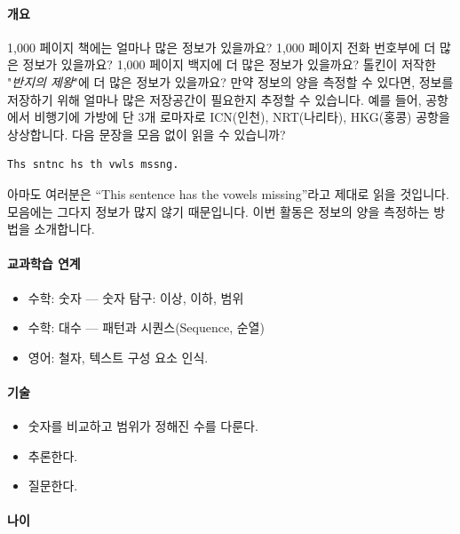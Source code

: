 \documentclass[]{article}
\begin{document}
\mbox{}\paragraph{개요}\label{section-73}

1,000 페이지 책에는 얼마나 많은 정보가 있을까요? 1,000 페이지 전화
번호부에 더 많은 정보가 있을까요? 1,000 페이지 백지에 더 많은 정보가
있을까요? 톨킨이 저작한 "\emph{반지의 제왕}"에 더 많은 정보가 있을까요?
만약 정보의 양을 측정할 수 있다면, 정보를 저장하기 위해 얼마나 많은
저장공간이 필요한지 추정할 수 있습니다. 예를 들어, 공항에서 비행기에
가방에 단 3개 로마자로 ICN(인천), NRT(나리타), HKG(홍콩) 공항을
상상합니다. 다음 문장을 모음 없이 읽을 수 있습니까?

\begin{verbatim}
Ths sntnc hs th vwls mssng.
\end{verbatim}

아마도 여러분은 ``This sentence has the vowels missing''라고 제대로 읽을
것입니다. 모음에는 그다지 정보가 많지 않기 때문입니다. 이번 활동은
정보의 양을 측정하는 방법을 소개합니다.

\mbox{}\paragraph{교과학습 연계}\label{section-74}

\begin{itemize}
\itemsep1pt\parskip0pt
\item
  수학: 숫자 --- 숫자 탐구: 이상, 이하, 범위
\item
  수학: 대수 --- 패턴과 시퀀스(Sequence, 순열)
\item
  영어: 철자, 텍스트 구성 요소 인식.
\end{itemize}

\mbox{}\paragraph{기술}\label{section-75}

\begin{itemize}
\itemsep1pt\parskip0pt
\item
  숫자를 비교하고 범위가 정해진 수를 다룬다.
\item
  추론한다.
\item
  질문한다.
\end{itemize}

\mbox{}\paragraph{나이}\label{section-76}
\end{document}

